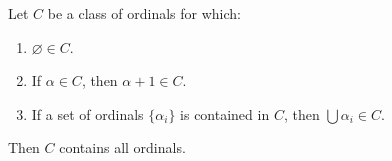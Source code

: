 Let $C$ be a class of ordinals for which:
\begin{enumerate}
\item[(a)] $\varnothing \in C$.
\item[(b)] If $\alpha \in C$, then $\alpha + 1 \in C$.
\item[(c)] If a set of ordinals $\{\alpha_i\}$ is contained in $C$, then $\bigcup \alpha_i \in C$.
\end{enumerate}
Then $C$ contains all ordinals.
